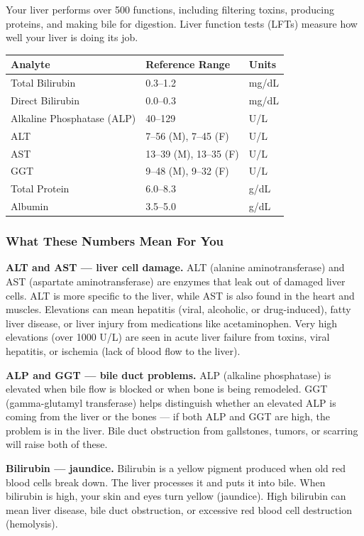 Your liver performs over 500 functions, including filtering toxins, producing proteins, and making bile for digestion. Liver function tests (LFTs) measure how well your liver is doing its job.

\begin{longtable}{@{}lll@{}}
\toprule
\textbf{Analyte} & \textbf{Reference Range} & \textbf{Units} \\
\midrule
Total Bilirubin & 0.3--1.2 & mg/dL \\
Direct Bilirubin & 0.0--0.3 & mg/dL \\
Alkaline Phosphatase (ALP) & 40--129 & U/L \\
ALT & 7--56 (M), 7--45 (F) & U/L \\
AST & 13--39 (M), 13--35 (F) & U/L \\
GGT & 9--48 (M), 9--32 (F) & U/L \\
Total Protein & 6.0--8.3 & g/dL \\
Albumin & 3.5--5.0 & g/dL \\
\bottomrule
\end{longtable}

\subsubsection{What These Numbers Mean For You}

\textbf{ALT and AST --- liver cell damage.} ALT (alanine aminotransferase) and AST (aspartate aminotransferase) are enzymes that leak out of damaged liver cells. ALT is more specific to the liver, while AST is also found in the heart and muscles. Elevations can mean hepatitis (viral, alcoholic, or drug-induced), fatty liver disease, or liver injury from medications like acetaminophen. Very high elevations (over 1000 U/L) are seen in acute liver failure from toxins, viral hepatitis, or ischemia (lack of blood flow to the liver).

\textbf{ALP and GGT --- bile duct problems.} ALP (alkaline phosphatase) is elevated when bile flow is blocked or when bone is being remodeled. GGT (gamma-glutamyl transferase) helps distinguish whether an elevated ALP is coming from the liver or the bones --- if both ALP and GGT are high, the problem is in the liver. Bile duct obstruction from gallstones, tumors, or scarring will raise both of these.

\textbf{Bilirubin --- jaundice.} Bilirubin is a yellow pigment produced when old red blood cells break down. The liver processes it and puts it into bile. When bilirubin is high, your skin and eyes turn yellow (jaundice). High bilirubin can mean liver disease, bile duct obstruction, or excessive red blood cell destruction (hemolysis).


